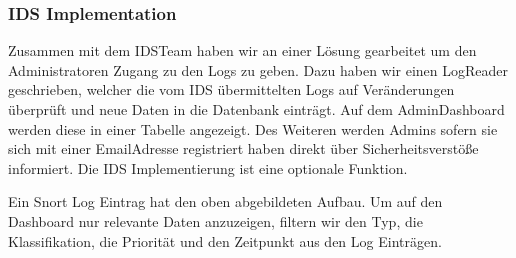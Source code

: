 \documentclass[letterpaper,10pt,ngerman]{sphinxmanual}
\begin{document}
\subsubsection{IDS Implementation}
\label{\detokenize{webapp:ids-implementation}}
Zusammen mit dem IDS\sphinxhyphen{}Team haben wir an einer Lösung gearbeitet um den Administratoren Zugang zu den Logs zu geben. Dazu haben wir einen Log\sphinxhyphen{}Reader geschrieben, welcher die vom IDS übermittelten Logs auf Veränderungen überprüft und neue Daten in die Datenbank einträgt. Auf dem Admin\sphinxhyphen{}Dashboard werden diese in einer Tabelle angezeigt. Des Weiteren werden Admins \sphinxhyphen{} sofern sie sich mit einer Email\sphinxhyphen{}Adresse registriert haben \sphinxhyphen{} direkt über Sicherheitsverstöße informiert. Die IDS Implementierung ist eine optionale Funktion.

\begin{sphinxVerbatim}[commandchars=\\\{\}]
\PYG{p}{[}\PYG{p}{]} \PYG{p}{[}\PYG{p}{]}     \PYG{p}{[}\PYG{p}{]}
\PYG{p}{[}    \PYG{p}{]} \PYG{p}{[} \PYG{p}{]}
   
      
           
\end{sphinxVerbatim}

Ein Snort Log Eintrag hat den oben abgebildeten Aufbau. Um auf den Dashboard nur relevante Daten anzuzeigen, filtern wir den Typ, die Klassifikation, die Priorität und den Zeitpunkt aus den Log Einträgen.
\end{document}

